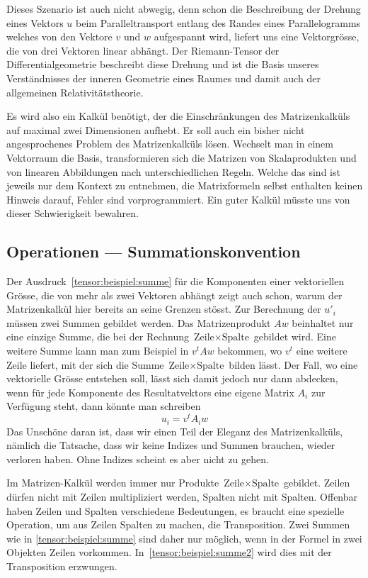 Dieses Szenario ist auch nicht abwegig, denn schon die Beschreibung
der Drehung eines Vektors $u$ beim Paralleltransport entlang des
Randes eines Parallelogramms welches von den Vektore $v$ und $w$ 
aufgespannt wird, liefert uns eine Vektorgrösse, die von drei Vektoren
linear abhängt.
Der Riemann-Tensor der Differentialgeometrie beschreibt diese Drehung
und ist die Basis unseres Verständnisses der inneren Geometrie eines
Raumes und damit auch der allgemeinen Relativitätstheorie.

Es wird also ein Kalkül benötigt, der die Einschränkungen des Matrizenkalküls
auf maximal zwei Dimensionen aufhebt.
Er soll auch ein bisher nicht angesprochenes Problem des Matrizenkalküls
lösen.
Wechselt man in einem Vektorraum die Basis, transformieren sich die 
Matrizen von Skalaprodukten und von linearen Abbildungen nach
unterschiedlichen Regeln.
Welche das sind ist jeweils nur dem Kontext zu entnehmen, die Matrixformeln
selbst enthalten keinen Hinweis darauf, Fehler sind vorprogrammiert.
Ein guter Kalkül müsste uns von dieser Schwierigkeit bewahren.

\subsection{Operationen --- Summationskonvention}
Der Ausdruck~\eqref{tensor:beispiel:summe} für die Komponenten einer
vektoriellen Grösse, die von mehr als zwei Vektoren abhängt zeigt 
auch schon, warum der Matrizenkalkül hier bereits an seine Grenzen
stösst.
Zur Berechnung der $u'_i$ müssen zwei Summen gebildet werden.
Das Matrizenprodukt $Aw$ beinhaltet nur eine einzige Summe, die bei
der Rechnung $\text{Zeile}\times\text{Spalte}$ gebildet wird.
Eine weitere Summe kann man zum Beispiel in $v^tAw$ bekommen, wo 
$v^t$ eine weitere Zeile liefert, mit der sich die Summe
$\text{Zeile}\times\text{Spalte}$ bilden lässt.
Der Fall, wo eine vektorielle Grösse entstehen soll, lässt sich damit
jedoch nur dann abdecken, wenn für jede Komponente des Resultatvektors
eine eigene Matrix $A_i$ zur Verfügung steht, dann könnte man schreiben
\begin{equation}
u_i = v^tA_iw
\label{tensor:beispiel:summe2}
\end{equation}
Das Unschöne daran ist, dass wir einen Teil der Eleganz des Matrizenkalküls,
nämlich die Tatsache, dass wir keine Indizes und Summen brauchen, wieder
verloren haben.
Ohne Indizes scheint es aber nicht zu gehen.

Im Matrizen-Kalkül werden immer nur Produkte $\text{Zeile}\times\text{Spalte}$
gebildet.
Zeilen dürfen nicht mit Zeilen multipliziert werden, Spalten nicht mit Spalten.
Offenbar haben Zeilen und Spalten verschiedene Bedeutungen, es braucht
eine spezielle Operation, um aus Zeilen Spalten zu machen, die Transposition.
Zwei Summen wie in \eqref{tensor:beispiel:summe} sind daher nur möglich,
wenn in der Formel in zwei Objekten Zeilen vorkommen.
In~\eqref{tensor:beispiel:summe2} wird dies mit der Transposition
erzwungen. 

